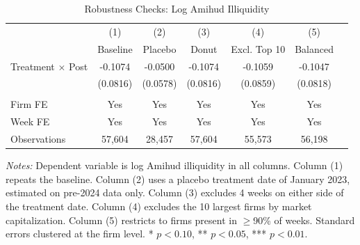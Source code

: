 \begin{table}[H]
\centering
\caption{Robustness Checks: Log Amihud Illiquidity}
\label{tab:robust}
\begin{threeparttable}
\begin{tabular}{lcccccc}
\toprule
 & (1) & (2) & (3) & (4) & (5) \\
 & Baseline & Placebo & Donut & Excl. Top 10 & Balanced \\
\midrule
Treatment $\times$ Post & -0.1074 & -0.0500 & -0.1074 & -0.1059 & -0.1047 \\
 & (0.0816) & (0.0578) & (0.0816) & (0.0859) & (0.0818) \\
 \\
\midrule
Firm FE & Yes & Yes & Yes & Yes & Yes \\
Week FE & Yes & Yes & Yes & Yes & Yes \\
Observations & 57,604 & 28,457 & 57,604 & 55,573 & 56,198 \\
\bottomrule
\end{tabular}
\begin{tablenotes}[flushleft]
\small
\item \textit{Notes:} Dependent variable is log Amihud illiquidity in all columns. Column (1) repeats the baseline. Column (2) uses a placebo treatment date of January 2023, estimated on pre-2024 data only. Column (3) excludes 4 weeks on either side of the treatment date. Column (4) excludes the 10 largest firms by market capitalization. Column (5) restricts to firms present in $\geq$90\% of weeks. Standard errors clustered at the firm level. * $p<0.10$, ** $p<0.05$, *** $p<0.01$.
\end{tablenotes}
\end{threeparttable}
\end{table}
